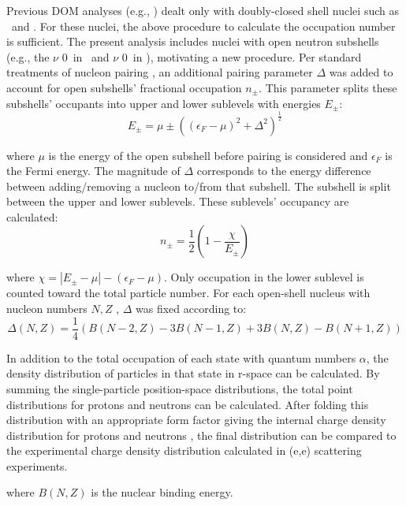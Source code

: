 Previous DOM analyses (e.g., \cite{MahzoonPhDThesis}) dealt only with doubly-closed 
shell nuclei such as \caForty\ and \caEight.
For these nuclei, the above procedure to calculate the occupation number is
sufficient. The present analysis includes nuclei with open neutron subshells
(e.g., the $\nu$ 0\dFive\ in \oEight\ and $\nu$ 0\fFive\ in \niEight), motivating a new
procedure. Per standard treatments of nucleon pairing \cite{BohrAndMottleson}, an additional
pairing parameter $\Delta$ was added to account for open subshells' fractional occupation $n_{\pm}$.
This parameter splits these subshells' occupants into upper and lower sublevels with energies 
$E_{\pm}$:
\begin{equation}
    E_{\pm} = \mu \pm ((\epsilon_{F}-\mu)^{2} + \Delta^{2})^{\frac{1}{2}}
\end{equation}

\noindent
where $\mu$ is the energy of the open subshell before pairing is considered and
$\epsilon_{F}$ is the Fermi
energy. The magnitude of $\Delta$ corresponds to the energy difference between
adding/removing a nucleon to/from that subshell. The subshell
is split between the upper and lower sublevels. These sublevels' occupancy are calculated:
\begin{equation}
    n_{\pm} = \frac{1}{2}\left( 1-\frac{\chi}{E_{\pm}}\right)
\end{equation}

\noindent
where $\chi = |E_{\pm}-\mu| - (\epsilon_{F} - \mu)$. Only occupation in the
lower sublevel is counted toward the total particle number. For each open-shell
nucleus with nucleon numbers $N, Z$ , $\Delta$ was fixed according to:
\begin{equation}
    \Delta(N,Z) = \frac{1}{4}\left(B(N-2,Z)-3B(N-1,Z) + 3B(N,Z)-B(N+1,Z)\right)
\end{equation}

In addition to the total occupation of each state with quantum numbers $\alpha$,
the density distribution of particles in that state in r-space can be calculated. By summing the
single-particle position-space distributions, the total point distributions for
protons and neutrons can be calculated.
After folding this distribution with an appropriate form factor giving the internal charge density
distribution for protons and neutrons \cite{FormFactorPaper}, the final distribution can be compared
to the experimental charge density distribution calculated in (e,e) scattering experiments.

\noindent
where $B(N,Z)$ is the nuclear binding energy.

